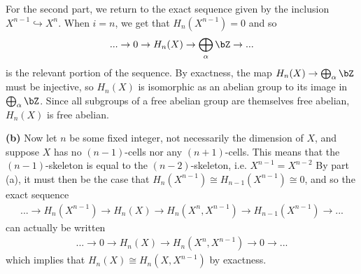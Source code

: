 \begin{homework}[e]
\begin{prf}
    For the second part, we return to the exact sequence given by the inclusion $X^{n-1}\hookrightarrow X^n$. When $i = n$, we get that $H_n(X^{n-1}) = 0$ and so
    \begin{align*}
      ... \to 0 \to H_n(X) \to \bigoplus_\alpha \bZ \to ... 
    \end{align*}
    is the relevant portion of the sequence. By exactness, the map $H_n(X) \to \bigoplus_\alpha \bZ$ must be injective, so $H_n(X)$ is isomorphic as an abelian group to its image in $\bigoplus_\alpha \bZ$. Since all subgroups of a free abelian group are themselves free abelian, $H_n(X)$ is free abelian.
    
    \bigskip

    \noindent \textbf{(b)}\hspace{1em} Now let $n$ be some fixed integer, not necessarily the dimension of $X$, and suppose $X$ has no $(n-1)$-cells nor any $(n+1)$-cells. This means that the $(n-1)$-skeleton is equal to the $(n-2)$-skeleton, i.e. $X^{n-1} = X^{n-2}$ By part (a), it must then be the case that $H_{n}(X^{n-1}) \cong H_{n-1}(X^{n-1}) \cong 0$, and so the exact sequence
    \begin{align*}
      ... \to H_n(X^{n-1}) \to H_n(X) \to H_n(X^n,X^{n-1}) \to H_{n-1}(X^{n-1}) \to ...
    \end{align*}
    can actually be written
    \begin{align*}
      ... \to 0 \to H_n(X) \to H_n(X^n,X^{n-1}) \to 0 \to ...
    \end{align*}
    which implies that $H_n(X) \cong H_n(X,X^{n-1})$ by exactness.


\end{prf}
\end{homework}
